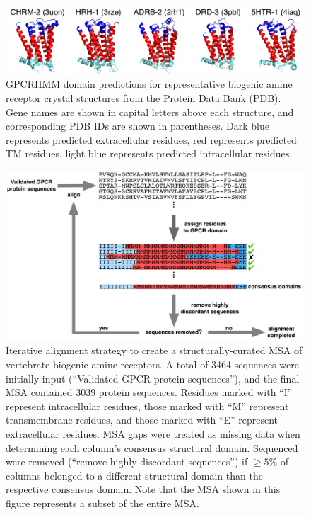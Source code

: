 \documentclass[fleqn,10pt]{wlpeerj}
\begin{document}
\newpage

\begin{figure}[htbp]
	\centerline{\includegraphics[width=15cm]{figures/pdb_gpcrhmm.pdf}}
	\caption{\label{pdb_gpcrhmm} GPCRHMM domain predictions for representative biogenic amine receptor crystal structures from the Protein Data Bank (PDB). Gene names are shown in capital letters above each structure, and corresponding PDB IDs are shown in parentheses. Dark blue represents predicted extracellular residues, red represents predicted TM residues, light blue represents predicted intracellular residues.}
\end{figure}



\begin{figure}[htbp]
	\centerline{\includegraphics[width=18cm]{figures/alignment_flowchart.pdf}}
	\caption{\label{flowchart} Iterative alignment strategy to create a structurally-curated MSA of vertebrate biogenic amine receptors. A total of 3464 sequences were initially input (``Validated GPCR protein sequences''), and the final MSA contained 3039 protein sequences. Residues marked with ``I'' represent intracellular residues, those marked with ``M'' represent transmembrane residues, and those marked with ``E'' represent extracellular residues. MSA gaps were treated as missing data when determining each column's consensus structural domain. Sequenced were removed (``remove highly discordant sequences'') if $\geq 5\%$ of columns belonged to a different structural domain than the respective consensus domain. Note that the MSA shown in this figure represents a subset of the entire MSA.}
\end{figure}
\end{document}
